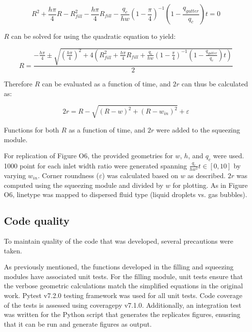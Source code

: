 $$
  R^2 + \frac{h\pi}{4}R -
  R_{fill}^2 - \frac{h\pi}{4}R_{fill} -
  \frac{q_c}{hw}
  \left(1-\frac{\pi}{4}\right)^{-1}
  \left(1-\frac{q_{gutter}}{q_c}\right)t = 0
$$

$R$ can be solved for using the quadratic equation to yield:

\begin{equation}
  R = \frac{-\frac{h\pi}{4} \pm 
  \sqrt{\left(\frac{h\pi}{4}\right)^2 +
  4\left(R_{fill}^2 + \frac{h\pi}{4}R_{fill} +
  \frac{q_c}{hw}
  \left(1-\frac{\pi}{4}\right)^{-1}
  \left(1-\frac{q_{gutter}}{q_c}\right)t\right)}}{2}
\end{equation}

Therefore $R$ can be evaluated as a function of time, and $2r$ can thus be calculated as:

\begin{equation}
  2r = R - \sqrt{\left(R - w\right)^2 + \left(R - w_{in}\right)^2} + \varepsilon
\end{equation}

Functions for both $R$ as a function of time, and $2r$ were added
to the squeezing module.

For replication of Figure O6, the provided geometries for $w$, $h$, and $q_c$ were used. 1000
point for each inlet width ratio were generated spanning $\frac{q_c}{hw^2}t \in [0,10]$ by varying 
$w_{in}$. Corner roundness ($\varepsilon$) was calculated based on $w$ as described. $2r$ was
computed using the squeezing module and divided by $w$ for plotting. As in Figure O6, linetype
was mapped to dispersed fluid type (liquid droplets vs. gas bubbles).

\subsection{Code quality}

To maintain quality of the code that was developed, several precautions were taken.

As previously mentioned, the functions developed in the filling and squeezing modules
have associated unit tests. For the filling module, unit tests ensure that the verbose
geometric calculations match the simplified equations in the original work.
Pytest v7.2.0\supercite{krekel_pytest_2004} testing framework was used for all unit tests.
Code coverage of the tests is assessed using coveragepy v7.1.0\supercite{batchelder_coveragepy_nodate}.
Additionally, an integration test was written for the Python script that generates the
replicates figures, enusring that it can be run and generate figures as output.

